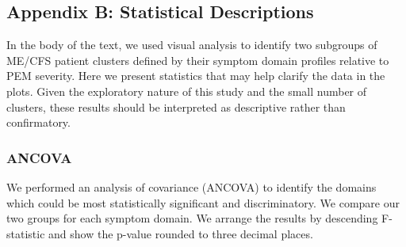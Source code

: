 \documentclass[
  letterpaper,
  DIV=11,
  numbers=noendperiod]{scrartcl}
\begin{document}
\FloatBarrier
\clearpage

\subsection*{Appendix B: Statistical Descriptions}\label{sec-stats}

In the body of the text, we used visual analysis to identify two
subgroups of ME/CFS patient clusters defined by their symptom domain
profiles relative to PEM severity. Here we present statistics that may
help clarify the data in the plots. Given the exploratory nature of this
study and the small number of clusters, these results should be
interpreted as descriptive rather than confirmatory.

\bigskip

\subsubsection*{ANCOVA}\label{sec-ancova}

We performed an analysis of covariance (ANCOVA) to identify the domains
which could be most statistically significant and discriminatory. We
compare our two groups for each symptom domain. We arrange the results
by descending F-statistic and show the p-value rounded to three decimal
places.

\FloatBarrier

\begin{table}[h]

\caption{\label{tbl-t6}ANCOVA Analysis}


\end{table}%
\end{document}

